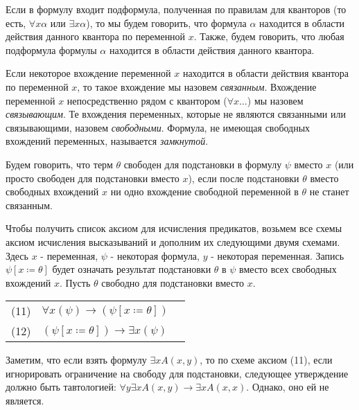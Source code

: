 \begin{definition}Если в формулу входит подформула, полученная по правилам
для кванторов (то есть, $\forall x \alpha$ или $\exists x \alpha$), то 
мы будем говорить, что формула $\alpha$ находится в области действия 
данного квантора по переменной $x$. Также, будем говорить, что любая подформула 
формулы $\alpha$ находится в области действия данного квантора.
\end{definition}

\begin{definition}Если некоторое вхождение переменной $x$ находится
в области действия квантора по переменной $x$, то такое вхождение
мы назовем \emph{связанным}. Вхождение переменной $x$ непосредственно рядом 
с квантором ($\forall x \dots$) мы назовем \emph{связывающим}.
Те вхождения переменных, которые не являются связанными 
или связывающими, назовем \emph{свободными}. Формула, не имеющая 
свободных вхождений переменных, называется \emph{замкнутой}.
\end{definition}

\begin{definition}Будем говорить, что терм $\theta$ свободен для
подстановки в формулу $\psi$ вместо $x$ (или просто свободен для 
подстановки вместо $x$), если после подстановки $\theta$ вместо 
свободных вхождений $x$ ни одно вхождение свободной переменной
в $\theta$ не станет связанным.
\end{definition}

Чтобы получить список аксиом для исчисления предикатов, возьмем все схемы
аксиом исчисления высказываний и дополним их следующими двумя схемами.
Здесь $x$ - переменная, $\psi$ - некоторая формула, $y$ - некоторая переменная.
Запись $\psi[x \coloneqq  \theta]$ будет означать результат подстановки 
$\theta$ в $\psi$ вместо всех свободных вхождений $x$. Пусть $\theta$ 
свободно для подстановки вместо $x$.

\begin{tabular}{lll}
(11) & $\forall{x}(\psi) \rightarrow (\psi[x \coloneqq  \theta])$\\ 
(12) & $(\psi[x \coloneqq  \theta]) \rightarrow \exists{x}(\psi)$
\end{tabular}

Заметим, что если взять формулу $\exists x A(x,y)$, то по схеме аксиом (11),
если игнорировать ограничение на свободу для подстановки, 
следующее утверждение должно быть тавтологией: 
$\forall y \exists x A(x,y) \rightarrow \exists x A (x,x)$. Однако, оно ей не является.

